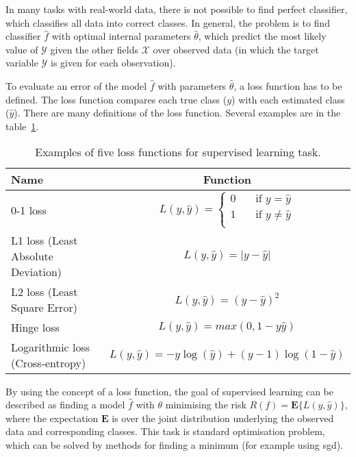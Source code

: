 \documentclass[thesis=M,english]{FITthesis}[2012/10/20]
\begin{document}
In many tasks with real-world data, there is not possible to find perfect classifier, which classifies all data into correct classes. In general, the problem is to find classifier $\hat{f}$ with optimal internal parameters $\hat{\theta}$, which predict the most likely value of $\mathcal{Y}$ given the other fields $\mathcal{X}$ over observed data (in which the target variable $\mathcal{Y}$ is given for each observation). 

To evaluate an error of the model $\hat{f}$ with parameters $\hat{\theta}$, a loss function has to be defined. The loss function compares each true class ($y$) with each estimated class ($\hat{y}$). There are many definitions of the loss function. Several examples are in the table~\ref{tab:loss_function}. 

\begin{table}[H]\centering
\begin{small}
    \caption{Examples of five loss functions for supervised learning task.}\label{tab:loss_function}
    \begin{tabular}{|l|c|}\hline
        Name & Function\tabularnewline \hline \hline
        0-1 loss & $L(y,\hat{y}) = \begin{cases} 0  & \quad \text{if } y = \hat{y}\\ 1 & \quad \text{if } y \neq \hat{y}\\\end{cases}$ \tabularnewline \hline
        L1 loss (Least Absolute Deviation) & $L(y,\hat{y}) = |y-\hat{y}|$ \tabularnewline \hline
        L2 loss (Least Square Error) & $L(y,\hat{y}) = {(y-\hat{y})}^2$ \tabularnewline \hline
        Hinge loss & $L(y,\hat{y}) = max{(0,1-y\hat{y})}$ \tabularnewline \hline
        Logarithmic loss (Cross-entropy) & $L(y,\hat{y}) = -y\log{(\hat{y})} + (y-1)\log{(1-\hat{y})}$ \tabularnewline \hline
    \end{tabular}
    \end{small}
\end{table}

By using the concept of a loss function, the goal of supervised learning can be described as finding a model $\hat{f}$ with $\theta$ minimising the risk $R(f) = \mathbf{E}\lbrace L(y, \hat{y}) \rbrace$, where the expectation $\mathbf{E} $ is over the joint distribution underlying the observed data and corresponding classes. This task is standard optimisation problem, which can be solved by methods for finding a minimum (for example using \gls{sgd}).\cite{theano_mlp} 
\end{document}
